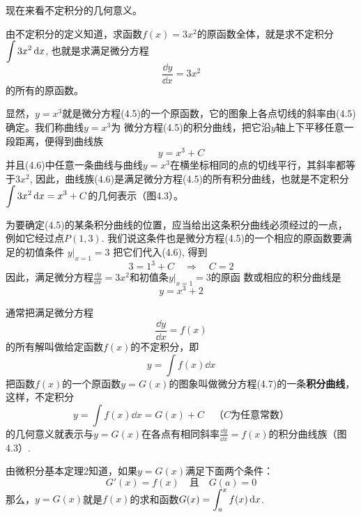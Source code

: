 现在来看不定积分的几何意义。

由不定积分的定义知道，求函数$f(x)=3x^2$的原函数全体，就是求不定积分$\displaystyle\int 3x^2\,{\rm d} x$, 也就是求满足微分方程
\begin{equation}
    \frac{\dd y}{\dd x}=3x^2
\end{equation}
的所有的原函数。

显然，$y=x^3$就是微分方程(4.5)的一个原函数，它的图象上各点切线的斜率由(4.5)确定。我们称曲线$y=x^3$为
微分方程(4.5)的积分曲线，把它沿$y$轴上下平移任意一段距离，便得到曲线族
\begin{equation}
    y=x^3+C
\end{equation}
并且(4.6)中任意一条曲线与曲线$y=x^3$在横坐标相同的点的切线平行，其斜率都等于$3x^2$, 因此，曲线族(4.6)是满足微分方程(4.5)的所有积分曲线，也就是不定积分$\displaystyle\int 3x^2\,{\rm d} x=x^3+C$的几何表示（图4.3）。

为要确定(4.5)的某条积分曲线的位置，应当给出这条积分曲线必须经过的一点，例如它经过点$P(1, 3)$. 我们说这条件也是微分方程(4.5)的一个相应的原函数要满足的初值条件
$y\big|_{x=1}=3$
把它们代入(4.6), 得到
\[3=1^3+C\quad \Rightarrow\quad C=2\]
因此，满足微分方程$\frac{\dd y}{\dd x}=3x^2$和初值条$y\big|_{x=1}=3$的原函
数或相应的积分曲线是
\[y=x^3+2\]

通常把满足微分方程
\begin{equation}
\frac{\dd y}{\dd x}=f(x)
\end{equation}
的所有解叫做给定函数$f(x)$的不定积分，即
\[y=\int f(x)\dd x\]
把函数$f(x)$的一个原函数$y=G(x)$的图象叫做微分方程(4.7)的一条\textbf{积分曲线}，这样，不定积分
\[y=\int f(x)\dd x=G(x)+C \quad \text{（$C$为任意常数）}\]
的几何意义就表示与$y=G(x)$在各点有相同斜率$\frac{\dd y}{\dd x}=f(x)$的积分曲线族（图4.3）.
\begin{figure}[htp]
    \centering
{}
    \caption{}
\end{figure}

由微积分基本定理2知道，如果$y=G(x)$满足下面两个条件：
\[G'(x)=f(x)\quad \text{且}\quad G(a)=0\]
那么，$y=G(x)$就是$f(x)$的求和函数$G(x)=\displaystyle\int^x_a f(x)\,{\rm d} x$.


